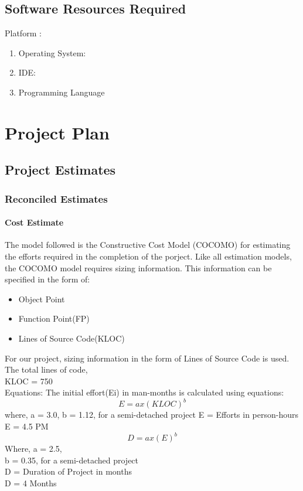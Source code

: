 \documentclass[oneside,a4paper,12pt]{report}
\begin{document}
\section{Software Resources Required}
Platform :
\begin{enumerate}
\item Operating System:
\item IDE:
\item Programming Language
\end{enumerate}




\chapter{Project Plan}

\section{Project Estimates}

\subsection{Reconciled Estimates}
\subsubsection{Cost Estimate}
\hspace*{0.25 in}
The model followed is the Constructive Cost Model (COCOMO) for estimating the
efforts required in the completion of the porject. Like all estimation models, the
COCOMO model requires sizing information. This information can be specified in
the form of:
\begin{itemize}
  \item Object Point
  \item Function Point(FP)
  \item Lines of Source Code(KLOC)
\end{itemize}
For our project, sizing information in the form of Lines of Source Code is used. The
total lines of code,\\
KLOC = 750\\
Equations: The initial effort(Ei) in man-months is calculated using equations:\\

\[E=ax(KLOC)^b\]
\hspace*{0.25 in}where, a = 3.0, b = 1.12, for a semi-detached project
E = Efforts in person-hours\\
E = 4.5 PM\\
\[D=ax(E)^b\]
Where, a = 2.5,\\
b = 0.35, for a semi-detached project\\
D = Duration of Project in months\\
D = 4 Months\\
\end{document}
